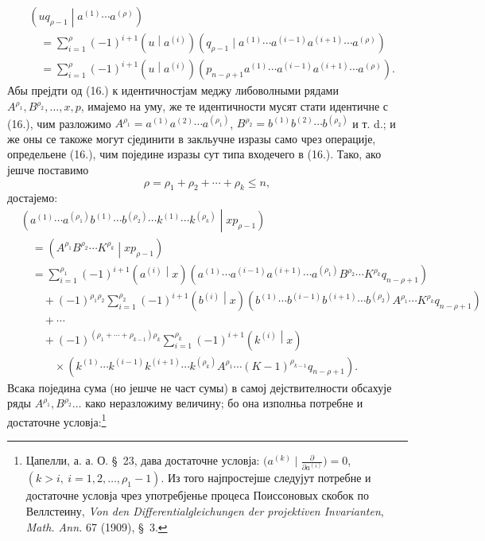 \documentclass[11pt]{article}
\newcommand{\pair}[2]{\left(#1\middle|#2\right)}
\begin{document}
\begin{equation}
\begin{aligned}
&\pair{u q_{\rho-1}}{a^{(1)}\cdots a^{(\rho)}}\\
&\quad=\sum_{i=1}^{\rho}(-1)^{i+1}\pair{u}{a^{(i)}}
(q_{\rho-1}\mid a^{(1)}\cdots a^{(i-1)}a^{(i+1)}\cdots a^{(\rho)})\\
&\quad=\sum_{i=1}^{\rho}(-1)^{i+1}\pair{u}{a^{(i)}}
(p_{n-\rho+1}a^{(1)}\cdots a^{(i-1)}a^{(i+1)}\cdots a^{(\rho)}).
\end{aligned}
\tag{17}
\end{equation}
Абы прејдти од (16.) к идентичностјам меджу либоволными рядами $A^{\rho_1},B^{\rho_2},\ldots,x,p$, имајемо на уму, же те идентичности мусят стати идентичне с (16.), чим разложимо $A^{\rho_1}=a^{(1)}a^{(2)}\cdots a^{(\rho_1)}$, $B^{\rho_2}=b^{(1)}b^{(2)}\cdots b^{(\rho_2)}$ и т. d.; и же оны се такоже могут сјединити в закльучне изразы само чрез операције, определьене (16.), чим поједине изразы сут типа входечего в (16.). Тако, ако јешче поставимо
\begin{equation}
 \rho=\rho_1+\rho_2+\cdots+\rho_k\le n,
\tag{18}
\end{equation}
достајемо:
\[
\begin{aligned}
&\pair{a^{(1)}\cdots a^{(\rho_1)}b^{(1)}\cdots b^{(\rho_2)}
\cdots k^{(1)}\cdots k^{(\rho_k)}}{xp_{\rho-1}}\\
&\quad=\pair{A^{\rho_1}B^{\rho_2}\cdots K^{\rho_k}}{xp_{\rho-1}} \\
&\quad=\sum_{i=1}^{\rho_1}(-1)^{i+1}\pair{a^{(i)}}{x}
(a^{(1)}\cdots a^{(i-1)}a^{(i+1)}\cdots a^{(\rho_1)}
B^{\rho_2}\cdots K^{\rho_k}q_{n-\rho+1})\\
&\qquad+(-1)^{\rho_1\rho_2}\sum_{i=1}^{\rho_2}(-1)^{i+1}\pair{b^{(i)}}{x}
(b^{(1)}\cdots b^{(i-1)}b^{(i+1)}\cdots b^{(\rho_2)}
A^{\rho_1}\cdots K^{\rho_k}q_{n-\rho+1})\\
&\qquad+\cdots\\
&\qquad+(-1)^{(\rho_1+\cdots+\rho_{k-1})\rho_k}
\sum_{i=1}^{\rho_k}(-1)^{i+1}\pair{k^{(i)}}{x}\\
&\qquad\quad\times
(k^{(1)}\cdots k^{(i-1)}k^{(i+1)}\cdots k^{(\rho_k)}
A^{\rho_1}\cdots (K-1)^{\rho_{k-1}}q_{n-\rho+1}).
\end{aligned}
\]
Всака поједина сума (но јешче не част сумы) в самој дејствителности обсахује ряды $A^{\rho_1},B^{\rho_2}\ldots$ како неразложиму величину; бо она изполньа потребне и достаточне условја:\footnote{Цапелли, а. а. О. \S\ 23, дава достаточне условја: $\bigl(a^{(k)}\mid \frac{\partial}{\partial a^{(i)}}\bigr)=0$, $(k>i,\ i=1,2,\ldots,\rho_1-1)$. Из того најпростејше следујут потребне и достаточне условја чрез употребјенье процеса Поиссоновых скобок по Веллстеину, \emph{Von den Differentialgleichungen der projektiven Invarianten}, \emph{Math. Ann.} 67 (1909), \S\ 3.}
\end{document}
